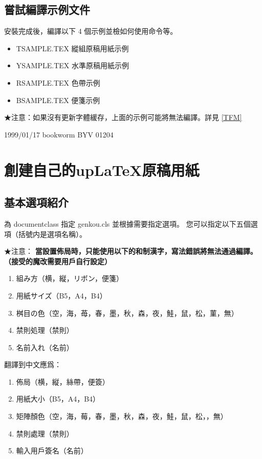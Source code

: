 \documentclass[a4,11pt,uplatex,openleft]{jsarticle}
\begin{document}
\clearpage

\subsection{嘗試編譯示例文件}
安裝完成後，編譯以下 4 個示例並檢如何使用命令等。
\begin{itemize}
\item TSAMPLE.TEX \quad 縱組原稿用紙示例
\item YSAMPLE.TEX \quad 水準原稿用紙示例
\item RSAMPLE.TEX \quad 色帶示例
\item BSAMPLE.TEX \quad 便箋示例
\end{itemize}

★注意：如果沒有更新字體緩存，上面的示例可能將無法編譯。詳見 \ref{TFM}

1999/01/17 bookworm BYV 01204

\section{創建自己的up\LaTeX 原稿用紙}

\subsection{基本選項紹介}
\par 為 documentclass 指定 genkou.cls 並根據需要指定選項。
您可以指定以下五個選項（括號内是選項名稱）。
\par ★注意： {\bf{當設置佈局時，只能使用以下的和制漢字，寫法錯誤將無法通過編譯。%
（接受的魔改需要用戶自行設定）}}


\begin{enumerate}
\item 組み方（横，縦，リボン，便箋）
\item 用紙サイズ（B5，A4，B4）
\item 桝目の色（空，海，苺，春，墨，秋，森，夜，鮭，鼠，松，菫，無）
\item 禁則処理（禁則）
\item 名前入れ（名前）
\end{enumerate}

翻譯到中文應爲：
\begin{enumerate}
\item 佈局（横，縦，絲帶，便簽）
\item 用紙大小（B5，A4，B4）
\item 矩陣顏色（空，海，莓，春，墨，秋，森，夜，鮭，鼠，松，，無）
\item 禁則處理（禁則）
\item 輸入用戶簽名（名前）
\end{enumerate}
\end{document}
